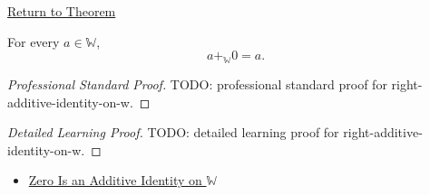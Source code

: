 \newpage
{}
\label{prf:right-additive-identity-on-w}

\begin{remark*}[Return]
\hyperref[thm:right-additive-identity-on-w]{Return to Theorem}
\end{remark*}

\begin{theorem*}
For every $a\in\mathbb{W}$,
\[
a+_{\mathbb{W}}0=a.
\]
\end{theorem*}

\begin{proof}[Professional Standard Proof]
\LRAProofBodyStart
TODO: professional standard proof for right-additive-identity-on-w.
\end{proof}

\begin{proof}[Detailed Learning Proof]
\LRAProofBodyStart
TODO: detailed learning proof for right-additive-identity-on-w.
\end{proof}

\begin{remark*}
\end{remark*}

\begin{dependencies}
\begin{itemize}
  \item \hyperref[thm:zero-additive-identity-on-w]{Zero Is an Additive Identity on $\mathbb{W}$}
\end{itemize}
\end{dependencies}

\clearpage
